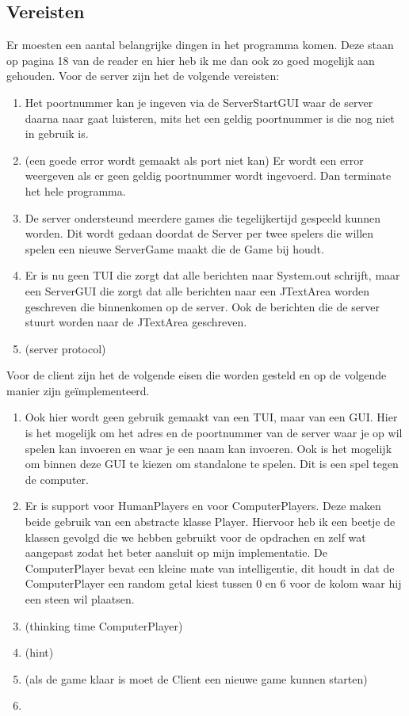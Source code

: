 \documentclass[12pt]{article}
\begin{document}
\subsection{Vereisten}
Er moesten een aantal belangrijke dingen in het programma komen. Deze staan op pagina 18 van de reader en hier heb ik me dan ook zo goed mogelijk aan gehouden.
Voor de server zijn het de volgende vereisten:
\begin{enumerate}
\item Het poortnummer kan je ingeven via de ServerStartGUI waar de server daarna naar gaat luisteren, mits het een geldig poortnummer is die nog niet in gebruik is.
\item (een goede error wordt gemaakt als port niet kan) Er wordt een error weergeven als er geen geldig poortnummer wordt ingevoerd. Dan terminate het hele programma. 
\item De server ondersteund meerdere games die tegelijkertijd gespeeld kunnen worden. Dit wordt gedaan doordat de Server per twee spelers die willen spelen een nieuwe ServerGame maakt die de Game bij houdt.
\item Er is nu geen TUI die zorgt dat alle berichten naar System.out schrijft, maar een ServerGUI die zorgt dat alle berichten naar een JTextArea worden geschreven die binnenkomen op de server. Ook de berichten die de server stuurt worden naar de JTextArea geschreven.
\item (server protocol)
\end{enumerate}
Voor de client zijn het de volgende eisen die worden gesteld en op de volgende manier zijn ge\"implementeerd.
\begin{enumerate}
 \item Ook hier wordt geen gebruik gemaakt van een TUI, maar van een GUI. Hier is het mogelijk om het adres en de poortnummer van de server waar je op wil spelen kan invoeren en waar je een naam kan invoeren. Ook is het mogelijk om binnen deze GUI te kiezen om standalone te spelen. Dit is een spel tegen de computer.
 \item Er is support voor HumanPlayers en voor ComputerPlayers. Deze maken beide gebruik van een abstracte klasse Player. Hiervoor heb ik een beetje de klassen gevolgd die we hebben gebruikt voor de opdrachen en zelf wat aangepast zodat het beter aansluit op mijn implementatie. De ComputerPlayer bevat een kleine mate van intelligentie, dit houdt in dat de ComputerPlayer een random getal kiest tussen 0 en 6 voor de kolom waar hij een steen wil plaatsen.
 \item (thinking time ComputerPlayer)
 \item (hint)
 \item (als de game klaar is moet de Client een nieuwe game kunnen starten)
 \item 
\end{enumerate}
\end{document}
